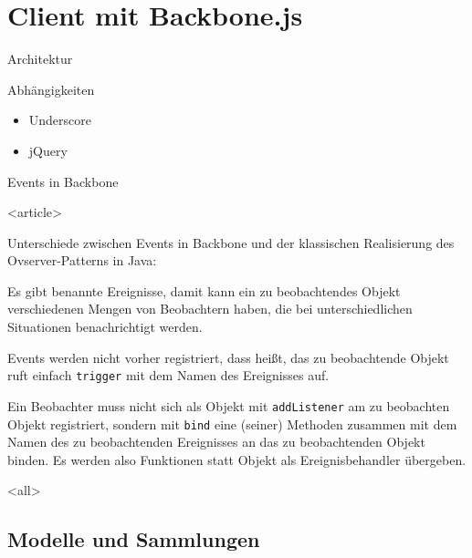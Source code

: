 \section[Client]{Client mit Backbone.js}

\begin{frame}{Architektur}
  \begin{center}
    
  \end{center}
\end{frame}

\begin{frame}{Abhängigkeiten}
  \begin{itemize}
    \item Underscore
    \item jQuery
  \end{itemize}
\end{frame}

\begin{Frame}[fragile]{Events in Backbone}
  \begin{center}
    
  \end{center}
\end{Frame}

\mode
<article>

Unterschiede zwischen Events in Backbone und der klassischen Realisierung
des Ovserver-Patterns in Java:
\begin{compactitem}
  \item Es gibt benannte Ereignisse, damit kann ein zu beobachtendes Objekt
    verschiedenen Mengen von Beobachtern haben, die bei unterschiedlichen
    Situationen benachrichtigt werden.
  \item Events werden nicht vorher registriert, dass heißt, das zu beobachtende
    Objekt ruft einfach \lstinline-trigger- mit dem Namen des Ereignisses auf.
  \item Ein Beobachter muss nicht sich als Objekt mit \lstinline-addListener-
    am zu beobachten Objekt registriert, sondern mit \lstinline-bind-
    eine (seiner) Methoden zusammen mit dem Namen des zu beobachtenden
    Ereignisses an das zu beobachtenden Objekt binden. Es werden also
    Funktionen statt Objekt als Ereignisbehandler übergeben.
\end{compactitem}

\mode
<all>

\subsection{Modelle und Sammlungen}

